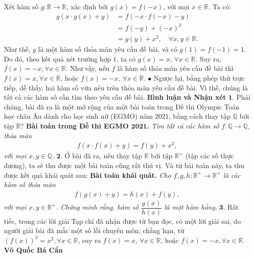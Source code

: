 \begin{multicols}{2}
	\vskip 0.05cm 
	Xét hàm số  $g: \mathbb{R} \to \mathbb{R}$, xác định bởi \linebreak$g(x) = f(-x)$, với mọi $x \in \mathbb{R}$. Ta có:
	\begin{align*}
		g\left( {x \cdot g\left( x \right) + y} \right) &= f\left( { - x \cdot f\left( { - x} \right) - y} \right) \\[-0.4ex]
		&= f\left( { - y} \right) + {\left( { - x} \right)^2} \\[-0.4ex]
		&= g\left( y \right) + {x^2},\quad\forall x,y \in \mathbb{R}.
	\end{align*}
	Như thế, $g$ là một hàm số thỏa mãn yêu cầu đề bài, và có $g(1) = f(-1) = 1$. Do đó, theo kết quả xét trường hợp $1$, ta có  $g(x) \!=\! x$, \linebreak$\forall x\in \mathbb{R}$. Suy ra,  $f(x) = -x, \forall x \in \mathbb{R}$.
	\vskip 0.05cm
	Như vậy, nếu $f$  là hàm số thỏa mãn yêu cầu đề bài thì  $f(x) = x, \forall x \in \mathbb{R}$, hoặc  $f(x) = -x$, $\forall x \in \mathbb{R}$.
	\vskip 0.05cm
	$\bullet$ Ngược lại, bằng phép thử trực tiếp, dễ thấy, hai hàm số vừa nêu trên thỏa mãn yêu cầu đề bài. Vì thế, chúng là tất cả các hàm số cần tìm theo yêu cầu đề bài.
	\vskip 0.05cm
	\textbf{\color{thachthuctoanhoc}Bình luận và Nhận xét}
	\vskip 0.05cm
	$\pmb{1.}$ Phải chăng, bài đã ra là một mở rộng của một bài toán trong Đề thi Olympic Toán học châu Âu dành cho học sinh nữ (EGMO) năm $2021$, bằng cách thay tập $\mathbb{Q}$  bởi tập  $\mathbb{R}$?
	\vskip 0.05cm
	\textbf{\color{thachthuctoanhoc}Bài toán trong Đề thi EGMO $\pmb{2021}$.} \textit{Tìm tất cả các hàm số $f: \mathbb{Q} \to \mathbb{Q}$, thỏa mãn
	\begin{align*}
		f\left( {x \cdot f\left( x \right) + y} \right) = f\left( y \right) + {x^2},
	\end{align*}
	với mọi  $x, y \in \mathbb{Q}$.}
	\vskip 0.05cm
	$\pmb{2.}$ Ở bài đã ra, nếu thay tập $\mathbb{R}$  bởi tập $\mathbb{R^+}$  (tập các số thực dương), ta sẽ thu được một bài toán cũng rất thú vị. Và từ bài toán này, ta thu được kết quả khái quát sau:
	\vskip 0.05cm
	\textbf{\color{thachthuctoanhoc}Bài toán khái quát.} \textit{Cho $f,g,h: \mathbb{R^+} \to \mathbb{R^+}$  là các hàm số thỏa mãn
	\begin{align*}
		f\left( {g\left( x \right) + y} \right) = h\left( x \right) + f\left( y \right),
	\end{align*}
	với mọi $x,y \in \mathbb{R^+}$. Chứng minh rằng, hàm số  $\dfrac{g(x)}{h(x)}$ là một hàm hằng.}
	\vskip 0.05cm
	$\pmb{3.}$ Rất tiếc, trong các lời giải Tạp chí đã nhận được từ bạn đọc, có một lời giải sai, do người giải bài đã mắc một số lỗi chuyên môn; chẳng hạn, từ  $(f(x))^2 \!=\! {x^2},\forall x \!\in\! \mathbb{R}$, suy ra  $f(x) \!=\! x$, $\forall x \in \mathbb{R}$, hoặc  $f\left( x \right) =  - x,\forall x \in \mathbb{R}$.
	\vskip 0.05cm
	\hfill	\textbf{\color{thachthuctoanhoc}Võ Quốc Bá Cẩn}
\end{multicols}
